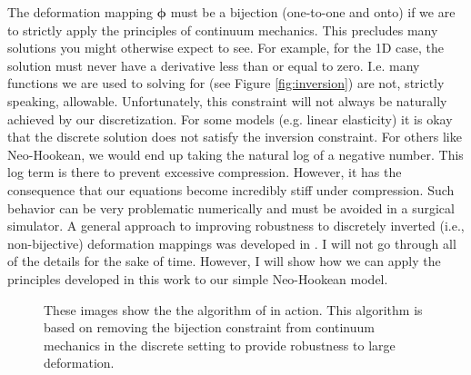 The deformation mapping $\boldsymbol{\phi}$ must be a bijection (one-to-one and onto) if we are to strictly apply the principles of continuum mechanics. This precludes many solutions you might otherwise expect to see. For example, for the 1D case, the solution must never have a derivative less than or equal to zero. I.e. many functions we are used to solving for (see Figure \ref{fig:inversion}) are not, strictly speaking, allowable. Unfortunately, this constraint will not always be naturally achieved by our discretization. For some models (e.g. linear elasticity) it is okay that the discrete solution does not satisfy the inversion constraint. For others like Neo-Hookean, we would end up taking the natural log of a negative number. This log term is there to prevent excessive compression. However, it has the consequence that our equations become incredibly stiff under compression. Such behavior can be very problematic numerically and must be avoided in a surgical simulator. A general approach to improving robustness to discretely inverted (i.e., non-bijective) deformation mappings was developed in \cite{Irving06}. I will not go through all of the details for the sake of time. However, I will show how we can apply the principles developed in this work to our simple Neo-Hookean model.

\begin{figure}
\caption{These images show the the algorithm of \cite{Irving06} in action. This algorithm is based on removing the bijection constraint from continuum mechanics in the discrete setting to provide robustness to large deformation.}
\end{figure}

